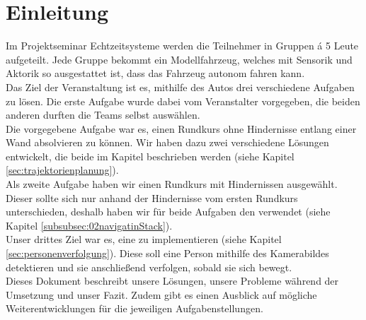 \section{Einleitung}
\label{sec:einleitung}
Im Projektseminar Echtzeitsysteme werden die Teilnehmer in Gruppen \'{a} 5 Leute aufgeteilt. Jede Gruppe bekommt ein Modellfahrzeug, welches mit Sensorik und Aktorik so ausgestattet ist, dass das Fahrzeug autonom fahren kann.\\
Das Ziel der Veranstaltung ist es, mithilfe des Autos drei verschiedene Aufgaben zu l\"osen. Die erste Aufgabe wurde dabei vom Veranstalter vorgegeben, die beiden anderen durften die Teams selbst ausw\"ahlen. \\
Die vorgegebene Aufgabe war es, einen Rundkurs ohne Hindernisse entlang einer Wand absolvieren zu k\"onnen. Wir haben dazu zwei verschiedene L\"osungen entwickelt, die beide im Kapitel  beschrieben werden (siehe Kapitel \ref{sec:trajektorienplanung}).\\
Als zweite Aufgabe haben wir einen Rundkurs mit Hindernissen ausgew\"ahlt. Dieser sollte sich nur anhand der Hindernisse vom ersten Rundkurs unterschieden, deshalb haben wir f\"ur beide Aufgaben den   verwendet (siehe Kapitel \ref{subsubsec:02navigatinStack}).\\
Unser drittes Ziel war es, eine  zu implementieren (siehe Kapitel \ref{sec:personenverfolgung}). Diese soll eine Person mithilfe des Kamerabildes detektieren und sie anschlie{\ss}end verfolgen, sobald sie sich bewegt.\\
Dieses Dokument beschreibt unsere L\"osungen, unsere Probleme w\"ahrend der Umsetzung und unser Fazit. Zudem gibt es einen Ausblick auf m\"ogliche Weiterentwicklungen f\"ur die jeweiligen Aufgabenstellungen.
